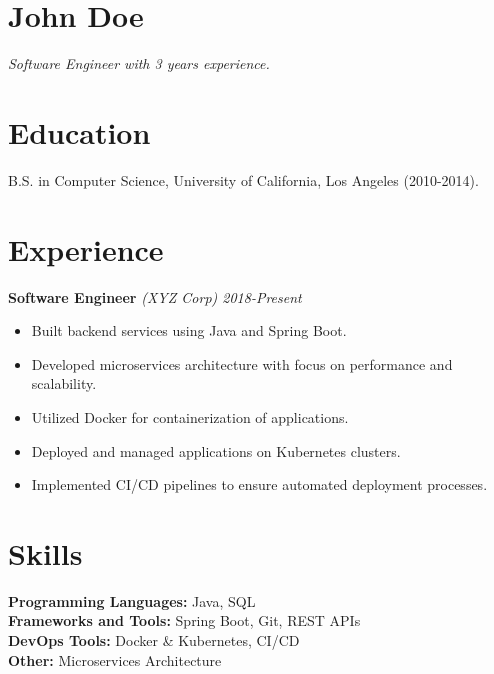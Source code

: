 \documentclass[a4paper]{article}
\begin{document}
\section*{\LARGE John Doe}
\textit{Software Engineer with 3 years experience.}
\vspace{0.5em}

\section*{\Large Education}
B.S. in Computer Science, University of California, Los Angeles (2010-2014).

\section*{\Large Experience}
\textbf{Software Engineer} \hfill \textit{(XYZ Corp) 2018-Present}\\
\begin{itemize}
    \item Built backend services using Java and Spring Boot.
    \item Developed microservices architecture with focus on performance and scalability.
    \item Utilized Docker for containerization of applications.
    \item Deployed and managed applications on Kubernetes clusters.
    \item Implemented CI/CD pipelines to ensure automated deployment processes.
\end{itemize}

\vspace{1em}
\section*{\Large Skills}
\textbf{Programming Languages:} Java, SQL \\
\textbf{Frameworks and Tools:} Spring Boot, Git, REST APIs\\
\textbf{DevOps Tools:} Docker \& Kubernetes, CI/CD\\
\textbf{Other:} Microservices Architecture
\end{document}
